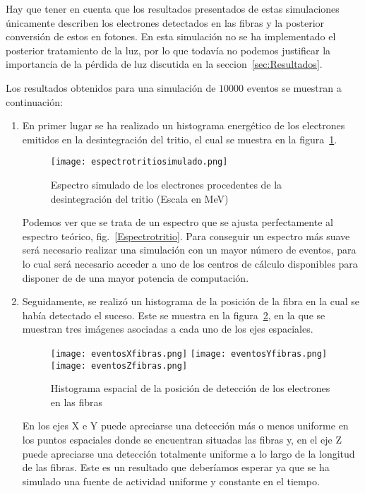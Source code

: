 Hay que tener en cuenta que los resultados presentados de estas simulaciones únicamente describen los electrones detectados en las fibras y la posterior conversión de estos en fotones. En esta simulación no se ha implementado el posterior tratamiento de la luz, por lo que todavía no podemos justificar la importancia de la pérdida de luz discutida en la seccion~\ref{sec:Resultados}.

Los resultados obtenidos para una simulación de $10000$ eventos se muestran a continuación:
\begin{enumerate}
\item{} En primer lugar se ha realizado un histograma energético de los electrones emitidos en la desintegración del tritio, el cual se muestra en la figura~\ref{espectrotritiosimulado}.

\begin{figure}[hbtp]
\centering
\texttt{[image: espectrotritiosimulado.png]}
\caption{Espectro simulado de los electrones procedentes de la desintegración del tritio (Escala en MeV)\label{espectrotritiosimulado}}
\end{figure}

Podemos ver que se trata de un espectro que se ajusta perfectamente al espectro teórico, fig.~\ref{Espectrotritio}. Para conseguir un espectro más suave será necesario realizar una simulación con un mayor número de eventos, para lo cual será necesario acceder a uno de los centros  de cálculo disponibles para disponer de de una mayor potencia de computación.

\item{} Seguidamente, se realizó un histograma de la posición de la fibra en la cual se había detectado el suceso. Este se muestra en la  figura~\ref{espectroespacial}, en la que se muestran tres imágenes asociadas a cada uno de los ejes espaciales.

\begin{figure}[htb]
\centering
{
\texttt{[image: eventosXfibras.png]} 
}
{
\texttt{[image: eventosYfibras.png]} 
}
{
\texttt{[image: eventosZfibras.png]} 
}
\caption{Histograma espacial de la posición de detección de los electrones en las fibras\label{espectroespacial}}
\end{figure}

En los ejes X e Y puede apreciarse una detección más o menos uniforme en los puntos espaciales donde se encuentran situadas las fibras y, en el eje Z puede apreciarse una detección totalmente uniforme a lo largo de la longitud de las fibras. Este es un resultado que deberíamos esperar ya que se ha simulado una fuente de actividad uniforme y constante en el tiempo.


\end{enumerate}
